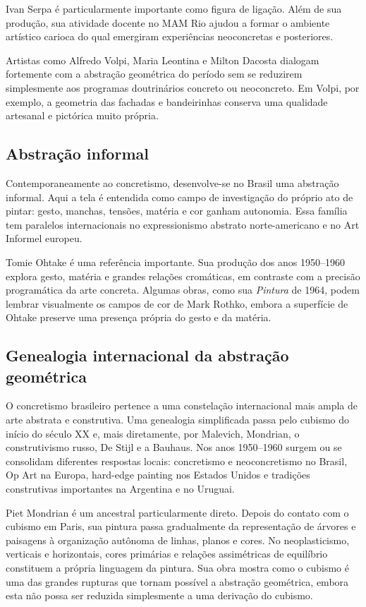 Ivan Serpa é particularmente importante como figura de ligação. Além de sua
produção, sua atividade docente no MAM Rio ajudou a formar o ambiente artístico
carioca do qual emergiram experiências neoconcretas e posteriores.

Artistas como Alfredo Volpi, Maria Leontina e Milton Dacosta dialogam fortemente
com a abstração geométrica do período sem se reduzirem simplesmente aos
programas doutrinários concreto ou neoconcreto. Em Volpi, por exemplo, a
geometria das fachadas e bandeirinhas conserva uma qualidade artesanal e
pictórica muito própria.

\subsection{Abstração informal}
\label{subsection-abstracao-informal}

Contemporaneamente ao concretismo, desenvolve-se no Brasil uma abstração
informal. Aqui a tela é entendida como campo de investigação do próprio ato de
pintar: gesto, manchas, tensões, matéria e cor ganham autonomia. Essa família
tem paralelos internacionais no expressionismo abstrato norte-americano e no
Art Informel europeu.

Tomie Ohtake é uma referência importante. Sua produção dos anos 1950--1960
explora gesto, matéria e grandes relações cromáticas, em contraste com a
precisão programática da arte concreta. Algumas obras, como sua \emph{Pintura}
de 1964, podem lembrar visualmente os campos de cor de Mark Rothko, embora a
superfície de Ohtake preserve uma presença própria do gesto e da matéria.

\subsection{Genealogia internacional da abstração geométrica}
\label{subsection-genealogia-abstracao}

O concretismo brasileiro pertence a uma constelação internacional mais ampla de
arte abstrata e construtiva. Uma genealogia simplificada passa pelo cubismo do
início do século XX e, mais diretamente, por Malevich, Mondrian, o
construtivismo russo, De Stijl e a Bauhaus. Nos anos 1950--1960 surgem ou se
consolidam diferentes respostas locais: concretismo e neoconcretismo no Brasil,
Op Art na Europa, hard-edge painting nos Estados Unidos e tradições
construtivas importantes na Argentina e no Uruguai.

Piet Mondrian é um ancestral particularmente direto. Depois do contato com o
cubismo em Paris, sua pintura passa gradualmente da representação de árvores e
paisagens à organização autônoma de linhas, planos e cores. No neoplasticismo,
verticais e horizontais, cores primárias e relações assimétricas de equilíbrio
constituem a própria linguagem da pintura. Sua obra mostra como o cubismo é uma
das grandes rupturas que tornam possível a abstração geométrica, embora esta
não possa ser reduzida simplesmente a uma derivação do cubismo.

